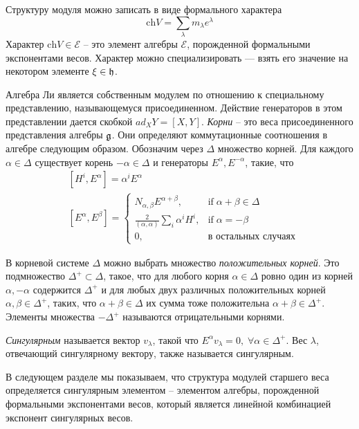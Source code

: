 Структуру модуля можно записать в виде формального характера
\begin{equation}
  \label{eq:116}
  \mathrm{ch}V=\sum_{\lambda}m_{\lambda} e^{\lambda}
\end{equation}
Характер  $\mathrm{ch}V\in \mathcal{E}$ -- это элемент алгебры  $\mathcal{E}$, порожденной формальными экспонентами весов. Характер можно специализировать --- взять его значение на некотором элементе $\xi\in\mathfrak{h}$.

Алгебра Ли является собственным модулем по отношению к специальному представлению, называющемуся присоединенном. Действие генераторов в этом представлении дается скобкой $ad_{X} Y=[X,Y]$. 
{\it Корни} -- это веса присоединенного представления алгебры $\mathfrak{g}$.  Они определяют коммутационные соотношения в алгебре следующим образом. Обозначим через $\Delta$ множество корней. Для каждого $\alpha\in \Delta$ существует корень  $-\alpha\in \Delta$ и генераторы $E^{\alpha}, E^{-\alpha}$, такие, что
\begin{align}
  \label{eq:63}
  &  [H^{i},E^{\alpha}]=\alpha^{i}E^{\alpha} \\
  &\left[E^{\alpha},E^{\beta}\right]=
  \begin{cases}
    N_{\alpha,\beta} E^{\alpha+\beta}, & \mbox{if}\; \alpha+\beta\in \Delta\\
    \frac{2}{(\alpha,\alpha)} \sum_{i}\alpha^{i} H^{i},&  \mbox{if}\; \alpha=-\beta\\
    0,&\mbox{в остальных случаях}
  \end{cases}
\end{align}

В корневой системе $\Delta$ можно выбрать множество {\it положительных корней}. Это подмножество  $\Delta^{+}\subset \Delta$, такое, что для любого корня $\alpha\in\Delta$ ровно один из корней $\alpha, -\alpha$ содержится $\Delta^{+}$ и для любых двух различных положительных корней $\alpha, \beta\in \Delta^{+}$, таких, что $\alpha+\beta\in \Delta$ их сумма тоже положительна $\alpha+\beta\in\Delta^{+}$.
Элементы множества $-\Delta^{+}$ называются отрицательными корнями.

\begin{definition}
\label{def:singular-weight}
  {\it Сингулярным} называется вектор $v_{\lambda}$, такой что $E^{\alpha}v_{\lambda}=0,\; \forall \alpha\in \Delta^+$. Вес $\lambda$, отвечающий сингулярному вектору, также называется сингулярным. 
\end{definition}
В следующем разделе мы показываем, что структура модулей старшего веса определяется сингулярным элементом -- элементом алгебры, порожденной формальными экспонентами весов, который является линейной комбинацией экспонент сингулярных весов. 

